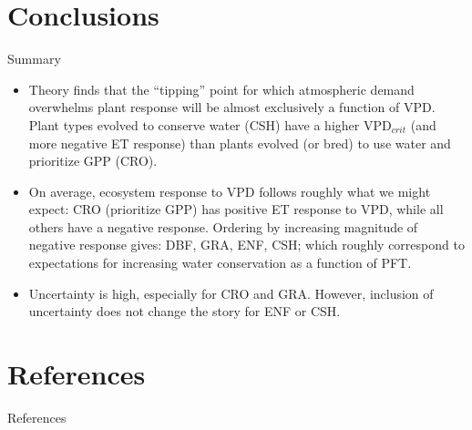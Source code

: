\documentclass{beamer}
\begin{document}
\section{Conclusions}
\begin{frame}{Summary}
  \begin{itemize}
  \item Theory finds that the ``tipping'' point for which atmospheric demand overwhelms plant response will be almost exclusively a function of VPD.  Plant types evolved to conserve water (CSH) have a higher VPD$_{crit}$ (and more negative ET response) than plants evolved (or bred) to use water and prioritize GPP (CRO).
  \item On average, ecosystem response to VPD follows roughly what we might expect: CRO (prioritize GPP) has positive ET response to VPD, while all others have a negative response. Ordering by increasing magnitude of negative response gives: DBF, GRA, ENF, CSH; which roughly correspond to expectations for increasing water conservation as a function of PFT.
  \item Uncertainty is high, especially for CRO and GRA. However, inclusion of uncertainty does not change the story for ENF or CSH.
  \end{itemize}
\end{frame}
  


\section{References}
\begin{frame}{References}
  \AtNextBibliography{\small}
  \printbibliography
\end{frame}


\end{document}
